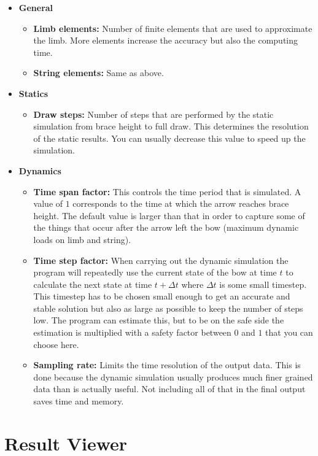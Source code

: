 \documentclass[12pt]{article}
\begin{document}
\begin{itemize}
\item \textbf{General}
    \begin{itemize}
    \item \textbf{Limb elements:} Number of finite elements that are used to approximate the limb. More elements increase the accuracy but also the computing time.
    \item \textbf{String elements:} Same as above.
    \end{itemize}
\item \textbf{Statics}
    \begin{itemize}
    \item \textbf{Draw steps:} Number of steps that are performed by the static simulation from brace height to full draw. This determines the resolution of the static results. You can usually decrease this value to speed up the simulation.
    \end{itemize}
\item \textbf{Dynamics}
    \begin{itemize}
    \item \textbf{Time span factor:} This controls the time period that is simulated. A value of $1$ corresponds to the time at which the arrow reaches brace height. The default value is larger than that in order to capture some of the things that occur after the arrow left the bow (maximum dynamic loads on limb and string).
    \item \textbf{Time step factor:} When carrying out the dynamic simulation the program will repeatedly use the current state of the bow at time $t$ to calculate the next state at time $t + \Delta t$ where $\Delta t$ is some small timestep. This timestep has to be chosen small enough to get an accurate and stable solution but also as large as possible to keep the number of steps low. The program can estimate this, but to be on the safe side the estimation is multiplied with a safety factor between $0$ and $1$ that you can choose here.
    \item \textbf{Sampling rate:} Limits the time resolution of the output data. This is done because the dynamic simulation usually produces much finer grained data than is actually useful. Not including all of that in the final output saves time and memory.
    \end{itemize}
\end{itemize}

\newpage
\section{Result Viewer}
\end{document}
